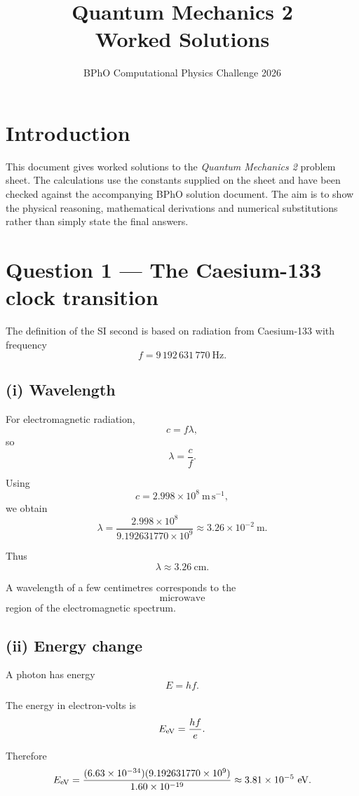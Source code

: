 \documentclass[11pt,a4paper]{article}
\title{\textbf{Quantum Mechanics 2}\\Worked Solutions}
\author{BPhO Computational Physics Challenge 2026}
\date{}
\begin{document}
\maketitle

\section*{Introduction}

This document gives worked solutions to the \emph{Quantum Mechanics 2} problem sheet.
The calculations use the constants supplied on the sheet and have been checked against
the accompanying BPhO solution document. The aim is to show the physical reasoning,
mathematical derivations and numerical substitutions rather than simply state the final
answers.

\section{Question 1 --- The Caesium-133 clock transition}

The definition of the SI second is based on radiation from Caesium-133 with frequency
\[
f=9\,192\,631\,770\ \mathrm{Hz}.
\]

\subsection{(i) Wavelength}

For electromagnetic radiation,
\[
c=f\lambda,
\]
so
\[
\lambda=\frac{c}{f}.
\]

Using
\[
c=2.998\times10^8\ \mathrm{m\,s^{-1}},
\]
we obtain
\[
\lambda
=
\frac{2.998\times10^8}
{9.192631770\times10^9}
\approx3.26\times10^{-2}\ \mathrm m.
\]

Thus
\[
\boxed{\lambda\approx3.26\ \mathrm{cm}}.
\]

A wavelength of a few centimetres corresponds to the
\[
\boxed{\text{microwave}}
\]
region of the electromagnetic spectrum.

\subsection{(ii) Energy change}

A photon has energy
\[
E=hf.
\]

The energy in electron-volts is
\[
E_{\rm eV}=\frac{hf}{e}.
\]

Therefore
\[
E_{\rm eV}
=
\frac{(6.63\times10^{-34})(9.192631770\times10^9)}
{1.60\times10^{-19}}
\approx3.81\times10^{-5}\ \mathrm{eV}.
\]
\end{document}

